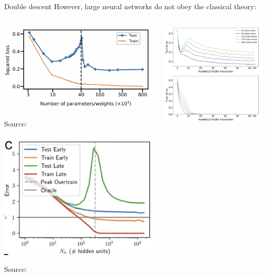 \documentclass[10pt, aspectratio=169]{beamer}
\begin{document}
\begin{frame}[t]{Double descent}
However, large neural networks do not obey the classical theory:
\begin{columns}
\begin{column}{0.5\linewidth}
\begin{center}
    \includegraphics[width=0.5\linewidth]{part-4-images/belkin2018.png} 
        
\vspace{-0.2cm}
{\scriptsize Source: \citep{belkin2019reconciling}}
\end{center}
\begin{center}
    \includegraphics[width=0.5\linewidth]{part-4-images/advani.png}
    
\vspace{-0.2cm}
{\scriptsize Source: \citep{advani2020high}}
    
\end{center}
\end{column}
\begin{column}{0.5\linewidth}
\begin{center}
\hspace{-1cm}
    \includegraphics[width=0.75\linewidth]{part-4-images/nakkiran.png}
    

\end{center}
\end{column}
\end{columns}
\end{frame}
\end{document}
